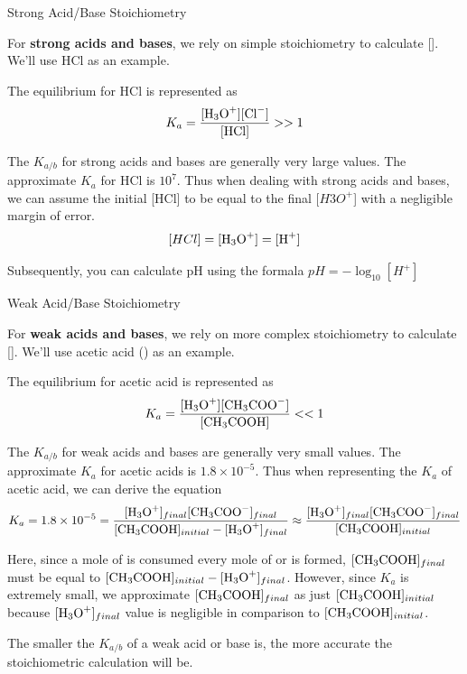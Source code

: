 \documentclass[10pt]{article}
\begin{document}
  \begin{core}{Strong Acid/Base Stoichiometry}
    
    For \textbf{strong acids and bases}, we rely on simple stoichiometry to calculate []. We'll use HCl as an example.


    The equilibrium for HCl is represented as 
    \[
      K_{a} = \frac{[\ce{H3O+}][\ce{Cl-}]}{[\ce{HCl}]} >> 1
    \]

    The $K_{a/b}$ for strong acids and bases are generally very large values. The approximate $K_a$ for HCl is $10^{7}$. Thus when dealing with strong acids and bases, we can assume the initial [HCl] to be equal to the final [$H3O^{+}$] with a negligible margin of error.
    \[
      [HCl] = [\ce{H3O+}] = [\ce{H+}]
    \]

    Subsequently, you can calculate pH using the formala $pH = -\log_{10}[H^{+}]$

  \end{core}

  \begin{core}{Weak Acid/Base Stoichiometry}
   
    For \textbf{weak acids and bases}, we rely on more complex stoichiometry to calculate []. We'll use acetic acid () as an example.


    The equilibrium for acetic acid is represented as 
    \[
      K_{a} = \frac{[\ce{H3O+}][\ce{CH3COO-}]}{[\ce{CH3COOH}]} << 1
    \]

    The $K_{a/b}$ for weak acids and bases are generally very small values. The approximate $K_a$ for acetic acids is $1.8 \times 10^{-5}$. Thus when representing the $K_a$ of acetic acid, we can derive the equation
    \[
      K_a = 1.8 \times 10^{-5} = \frac{[\ce{H3O+}]_{final}[\ce{CH3COO-}]_{final}}{[\ce{CH3COOH}]_{initial} - [\ce{H3O+}]_{final}} \approx \frac{[\ce{H3O^+}]_{final}[\ce{CH3COO-}]_{final}}{[\ce{CH3COOH}]_{initial}}
    \]

    Here, since a mole of  is consumed every mole of  or  is formed, $[\ce{CH3COOH}]_{final}$ must be equal to $[\ce{CH3COOH}]_{initial} - [\ce{H3O+}]_{final}$. However, since $K_a$ is extremely small, we approximate $[\ce{CH3COOH}]_{final}$ as just $[\ce{CH3COOH}]_{initial}$ because $[\ce{H3O+}]_{final}$ value is negligible in comparison to $[\ce{CH3COOH}]_{initial}$.

    The smaller the $K_{a/b}$ of a weak acid or base is, the more accurate the stoichiometric calculation will be.

  \end{core}
\end{document}
